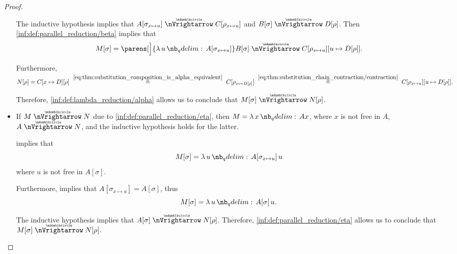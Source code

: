 \begin{proof}
\begin{itemize}
    The inductive hypothesis implies that \( A[\sigma_{x \mapsto u}] \ppred C[\rho_{x \mapsto u}] \) and \( B[\sigma] \ppred D[\rho] \). Then \ref{inf:def:parallel_reduction/beta} implies that
    \begin{equation*}
      M[\sigma]
      =
      \parens[\Big]{ \qabs u A[\sigma_{x \mapsto u}] } B[\sigma]
      \ppred
      C[\rho_{x \mapsto u}][u \mapsto D[\rho]].
    \end{equation*}

    Furthermore,
    \begin{equation*}
      N[\rho]
      =
      C[x \mapsto D][\rho]
      \reloset {\eqref{eq:thm:substitution_composition_is_alpha_equivalent}} \aequiv
      C[\rho_{x \mapsto D[\rho]}]
      \reloset {\eqref{eq:thm:substitution_chain_contraction/contraction}} \aequiv
      C[\rho_{x \mapsto u}][u \mapsto D[\rho]].
    \end{equation*}

    Therefore, \ref{inf:def:lambda_reduction/alpha} allows us to conclude that \( M[\sigma] \ppred N[\rho] \).

    \item If \( M \ppred N \) due to \ref{inf:def:parallel_reduction/eta}, then \( M = \qabs x Ax \), where \( x \) is not free in \( A \), \( A \ppred N \), and the inductive hypothesis holds for the latter.

     implies that
    \begin{equation*}
      M[\sigma] = \qabs u A[\sigma_{x \mapsto u}] \thinspace u
    \end{equation*}
    where \( u \) is not free in \( A[\sigma] \).

    Furthermore,  implies that \( A[\sigma_{x \mapsto u}] = A[\sigma] \), thus
    \begin{equation*}
      M[\sigma] = \qabs u A[\sigma] \thinspace u.
    \end{equation*}

    The inductive hypothesis implies that \( A[\sigma] \ppred N[\rho] \). Therefore, \ref{inf:def:parallel_reduction/eta} allows us to conclude that \( M[\sigma] \ppred N[\rho] \).
  \end{itemize}
\end{proof}

